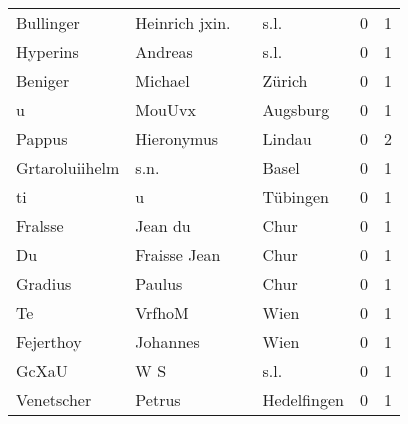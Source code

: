 \begin{center}
\begin{tiny}
\begin{longtabu}{llllrr}
                Bullinger &                     Heinrich jxin. &             &                                        s.l. &          0 &         1 \\
                 Hyperins &                            Andreas &             &                                        s.l. &          0 &         1 \\
                  Beniger &                            Michael &             &                                      Zürich &          0 &         1 \\
                        u &                             MouUvx &             &                                    Augsburg &          0 &         1 \\
                   Pappus &                         Hieronymus &             &                                      Lindau &          0 &         2 \\
           Grtaroluiihelm &                               s.n. &             &                                       Basel &          0 &         1 \\
                       ti &                                  u &             &                                    Tübingen &          0 &         1 \\
                  Fralsse &                            Jean du &             &                                        Chur &          0 &         1 \\
                       Du &                       Fraisse Jean &             &                                        Chur &          0 &         1 \\
                  Gradius &                             Paulus &             &                                        Chur &          0 &         1 \\
                       Te &                             VrfhoM &             &                                        Wien &          0 &         1 \\
                Fejerthoy &                           Johannes &             &                                        Wien &          0 &         1 \\
                    GcXaU &                                W S &             &                                        s.l. &          0 &         1 \\
               Venetscher &                             Petrus &             &                                 Hedelfingen &          0 &         1 \\

\end{longtabu}
\end{tiny}
\end{center}
